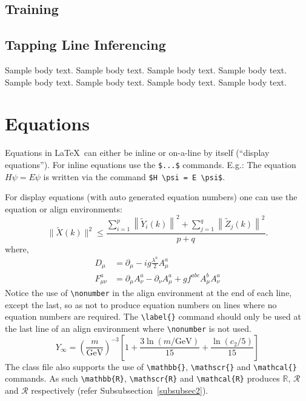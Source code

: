 \documentclass[default,pdflatex,iicol]{sn-jnl}%
\begin{document}
\subsection{Training}

\subsection{Tapping Line Inferencing}



Sample body text. Sample body text. Sample body text. Sample body text. Sample body text. Sample body text. Sample body text. Sample body text. 

\section{Equations}\label{sec4}

Equations in \LaTeX\ can either be inline or on-a-line by itself (``display equations''). For
inline equations use the \verb+$...$+ commands. E.g.: The equation
$H\psi = E \psi$ is written via the command \verb+$H \psi = E \psi$+.

For display equations (with auto generated equation numbers)
one can use the equation or align environments:
\begin{equation}
\|\tilde{X}(k)\|^2 \leq\frac{\sum\limits_{i=1}^{p}\left\|\tilde{Y}_i(k)\right\|^2+\sum\limits_{j=1}^{q}\left\|\tilde{Z}_j(k)\right\|^2 }{p+q}.\label{eq1}
\end{equation}
where,
\begin{align}
D_\mu &=  \partial_\mu - ig \frac{\lambda^a}{2} A^a_\mu \nonumber \\
F^a_{\mu\nu} &= \partial_\mu A^a_\nu - \partial_\nu A^a_\mu + g f^{abc} A^b_\mu A^a_\nu \label{eq2}
\end{align}
Notice the use of \verb+\nonumber+ in the align environment at the end
of each line, except the last, so as not to produce equation numbers on
lines where no equation numbers are required. The \verb+\label{}+ command
should only be used at the last line of an align environment where
\verb+\nonumber+ is not used.
\begin{equation}
Y_\infty = \left( \frac{m}{\textrm{GeV}} \right)^{-3}
    \left[ 1 + \frac{3 \ln(m/\textrm{GeV})}{15}
    + \frac{\ln(c_2/5)}{15} \right]
\end{equation}
The class file also supports the use of \verb+\mathbb{}+, \verb+\mathscr{}+ and
\verb+\mathcal{}+ commands. As such \verb+\mathbb{R}+, \verb+\mathscr{R}+
and \verb+\mathcal{R}+ produces $\mathbb{R}$, $\mathscr{R}$ and $\mathcal{R}$
respectively (refer Subsubsection~\ref{subsubsec2}).
\end{document}
